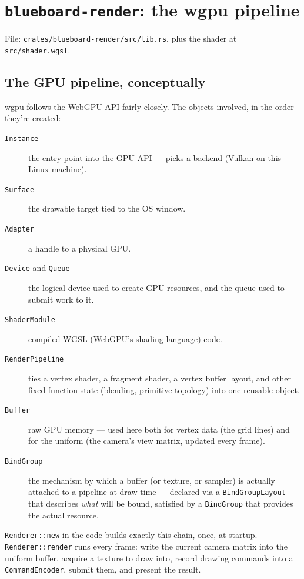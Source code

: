 \documentclass[11pt]{article}
\begin{document}
\section{\texttt{blueboard-render}: the wgpu pipeline}

File: \texttt{crates/blueboard-render/src/lib.rs}, plus the shader at
\texttt{src/shader.wgsl}.

\subsection{The GPU pipeline, conceptually}
wgpu follows the WebGPU API fairly closely. The objects involved, in the order they're
created:
\begin{description}
  \item[\texttt{Instance}] the entry point into the GPU API — picks a backend (Vulkan on
    this Linux machine).
  \item[\texttt{Surface}] the drawable target tied to the OS window.
  \item[\texttt{Adapter}] a handle to a physical GPU.
  \item[\texttt{Device} and \texttt{Queue}] the logical device used to create GPU
    resources, and the queue used to submit work to it.
  \item[\texttt{ShaderModule}] compiled WGSL (WebGPU's shading language) code.
  \item[\texttt{RenderPipeline}] ties a vertex shader, a fragment shader, a vertex buffer
    layout, and other fixed-function state (blending, primitive topology) into one
    reusable object.
  \item[\texttt{Buffer}] raw GPU memory — used here both for vertex data (the grid lines)
    and for the uniform (the camera's view matrix, updated every frame).
  \item[\texttt{BindGroup}] the mechanism by which a buffer (or texture, or sampler) is
    actually attached to a pipeline at draw time — declared via a
    \texttt{BindGroupLayout} that describes \emph{what} will be bound, satisfied by a
    \texttt{BindGroup} that provides the actual resource.
\end{description}
\texttt{Renderer::new} in the code builds exactly this chain, once, at startup.
\texttt{Renderer::render} runs every frame: write the current camera matrix into the
uniform buffer, acquire a texture to draw into, record drawing commands into a
\texttt{CommandEncoder}, submit them, and present the result.
\end{document}
